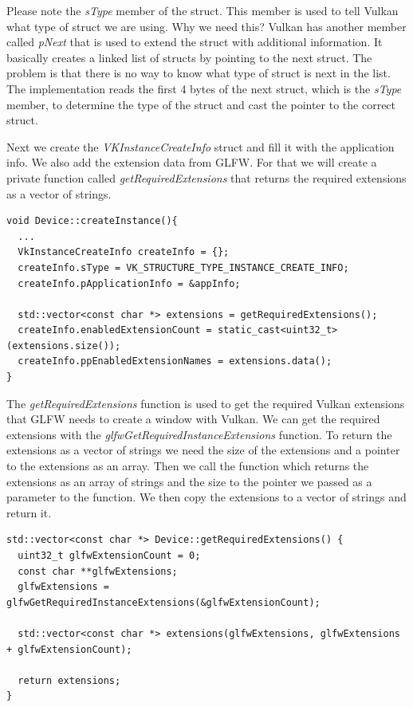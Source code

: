 \documentclass[12pt]{report} \usepackage{preamble}
\begin{document}
Please note the \textit{sType} member of the struct. This member is used to tell Vulkan
what type of struct we are using. Why we need this? Vulkan has another member called
\textit{pNext} that is used to extend the struct with additional information. It basically
creates a linked list of structs by pointing to the next struct. The problem is that there is
no way to know what type of struct is next in the list. The implementation reads the first 4 bytes
of the next struct, which is the \textit{sType} member, to determine the type of the struct and
cast the pointer to the correct struct.

Next we create the \textit{VKInstanceCreateInfo} struct and fill it with the application info.
We also add the extension data from \ac{GLFW}.
For that we will create a private function called \textit{getRequiredExtensions} that returns
the required extensions as a vector of strings.

\begin{lstlisting}[Language=C++]
void Device::createInstance(){
  ...
  VkInstanceCreateInfo createInfo = {};
  createInfo.sType = VK_STRUCTURE_TYPE_INSTANCE_CREATE_INFO;
  createInfo.pApplicationInfo = &appInfo;

  std::vector<const char *> extensions = getRequiredExtensions();
  createInfo.enabledExtensionCount = static_cast<uint32_t>(extensions.size());
  createInfo.ppEnabledExtensionNames = extensions.data();
}
\end{lstlisting}

The \textit{getRequiredExtensions} function is used to get the required Vulkan extensions
that \ac{GLFW} needs to create a window with Vulkan. We can get the required extensions with the
\textit{glfwGetRequiredInstanceExtensions} function. To return the extensions as a vector of strings
we need the size of the extensions and a pointer to the extensions as an array. Then we call the function
which returns the extensions as an array of strings and the size
to the pointer we passed as a parameter to the function. We then copy the extensions to a vector of strings
and return it.

\begin{lstlisting}[Language=C++]
std::vector<const char *> Device::getRequiredExtensions() {
  uint32_t glfwExtensionCount = 0;
  const char **glfwExtensions;
  glfwExtensions = glfwGetRequiredInstanceExtensions(&glfwExtensionCount);

  std::vector<const char *> extensions(glfwExtensions, glfwExtensions + glfwExtensionCount);

  return extensions;
}
\end{lstlisting}
\end{document}
